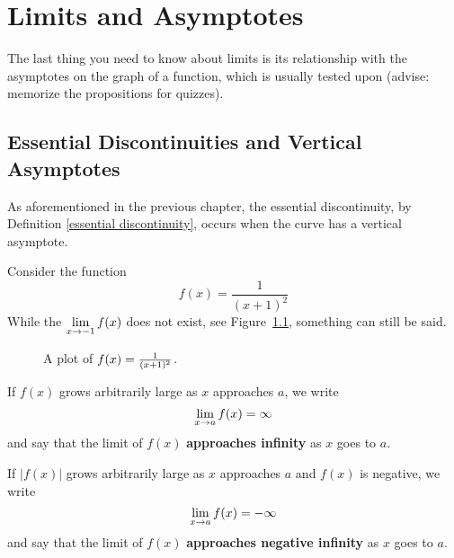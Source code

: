 \chapter{Limits and Asymptotes}

The last thing you need to know about limits is its relationship with the asymptotes on the graph of a function, which is usually tested upon (advise: memorize the propositions for quizzes).

\section{Essential Discontinuities and Vertical Asymptotes}
As aforementioned in the previous chapter, the essential discontinuity, by Definition \ref{essential discontinuity}, occurs when the curve has a vertical asymptote.

Consider the function
$$
f(x) = \frac{1}{(x+1)^2}
$$
While the $\displaystyle\lim\limits_{x\to -1} f(x)$ does not exist, see
Figure~\ref{plot:1/(x+1)^2}, something can still be said. \cite{mooc}
\begin{figure}[H]
    \centering
    \caption{A plot of $f(x)=\protect\frac{1}{(x+1)^2}$. \cite{mooc}}
    \label{plot:1/(x+1)^2}
\end{figure}


\begin{definition}\label{def:inflimit}
If $f(x)$ grows arbitrarily large as $x$ approaches $a$, we write
\[
\displaystyle\lim\limits_{x\to a} f(x) = \infty
\]
and say that the limit of $f(x)$ \textbf{approaches infinity} as $x$
goes to $a$.

If $|f(x)|$ grows arbitrarily large as $x$ approaches $a$ and $f(x)$ is
negative, we write
\[
\displaystyle\lim\limits_{x\to a} f(x) = -\infty
\]
and say that the limit of $f(x)$ \textbf{approaches negative infinity}
as $x$ goes to $a$.
\\\cite{mooc}
\end{definition}

